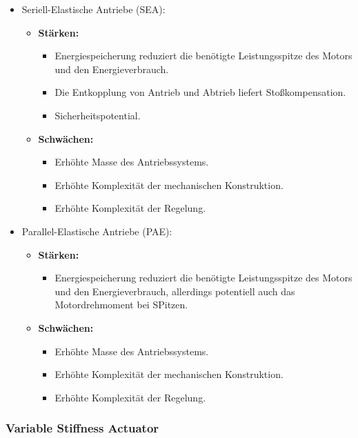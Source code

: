 \documentclass[a4paper, 11pt, accentcolor = tud3b]{tudreport}
\begin{document}
				\begin{itemize}
					\item Seriell-Elastische Antriebe (SEA):
						\begin{itemize}
							\item \textbf{Stärken:}
								\begin{itemize}
									\item Energiespeicherung reduziert die benötigte Leistungsspitze des Motors und den Energieverbrauch.
									\item Die Entkopplung von Antrieb und Abtrieb liefert Stoßkompensation.
									\item Sicherheitspotential.
								\end{itemize}
							\item \textbf{Schwächen:}
								\begin{itemize}
									\item Erhöhte Masse des Antriebssystems.
									\item Erhöhte Komplexität der mechanischen Konstruktion.
									\item Erhöhte Komplexität der Regelung.
								\end{itemize}
						\end{itemize}
					\item Parallel-Elastische Antriebe (PAE):
						\begin{itemize}
							\item \textbf{Stärken:}
								\begin{itemize}
									\item Energiespeicherung reduziert die benötigte Leistungsspitze des Motors und den Energieverbrauch, allerdings potentiell auch das Motordrehmoment bei SPitzen.
								\end{itemize}
							\item \textbf{Schwächen:}
								\begin{itemize}
									\item Erhöhte Masse des Antriebssystems.
									\item Erhöhte Komplexität der mechanischen Konstruktion.
									\item Erhöhte Komplexität der Regelung.
								\end{itemize}
						\end{itemize}
				\end{itemize}

				\subsubsection{Variable Stiffness Actuator} %
\end{document}
